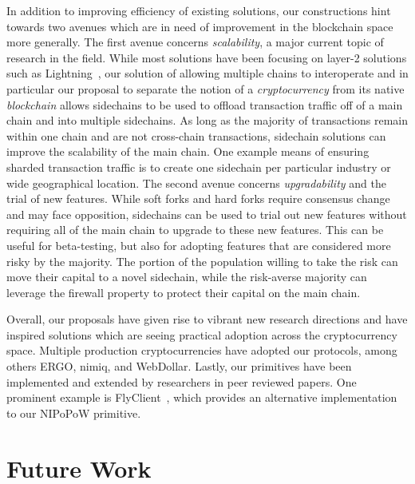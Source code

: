 In addition to improving efficiency of existing solutions, our constructions
hint towards two avenues which are in need of improvement in the blockchain
space more generally. The first avenue concerns \emph{scalability}, a major
current topic of research in the field. While most solutions have been focusing
on layer-2 solutions such as Lightning~\cite{lightning}, our solution of
allowing multiple chains to interoperate and in particular our proposal to
separate the notion of a \emph{cryptocurrency} from its native \emph{blockchain}
allows sidechains to be used to offload transaction traffic off of a main chain
and into multiple sidechains. As long as the majority of transactions remain
within one chain and are not cross-chain transactions, sidechain solutions can
improve the scalability of the main chain. One example means of ensuring sharded
transaction traffic is to create one sidechain per particular industry or
wide geographical location. The second avenue concerns \emph{upgradability} and
the trial of new features. While soft forks and hard forks require consensus
change and may face opposition, sidechains can be used to trial out new features
without requiring all of the main chain to upgrade to these new features. This
can be useful for beta-testing, but also for adopting features that are
considered more risky by the majority. The portion of the population willing to
take the risk can move their capital to a novel sidechain, while the risk-averse
majority can leverage the firewall property to protect their capital on the main
chain.

Overall, our proposals have given rise to vibrant new research directions and
have inspired solutions which are seeing practical adoption across the
cryptocurrency space. Multiple production cryptocurrencies have adopted our
protocols, among others ERGO, nimiq, and WebDollar. Lastly, our primitives have
been implemented and extended by researchers in peer reviewed papers. One
prominent example is FlyClient~\cite{flyclient}, which provides an alternative
implementation to our NIPoPoW primitive.

\section{Future Work}

